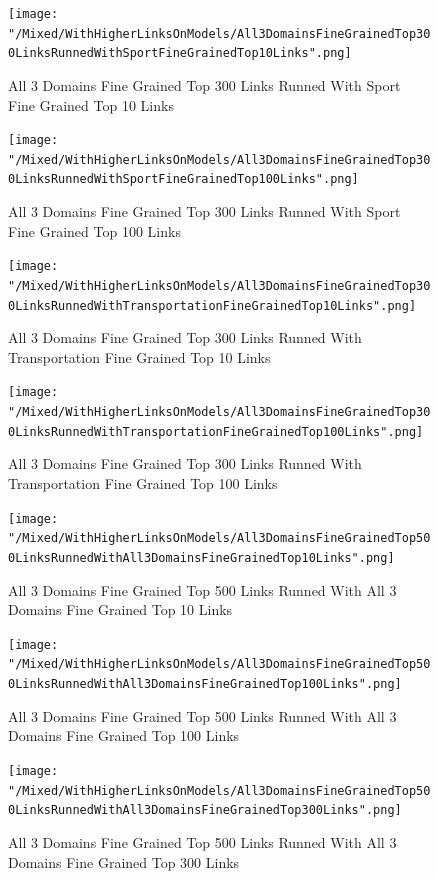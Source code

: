 \documentclass[thesis=M,english]{FITthesis}[2018/05/30]
\begin{document}
	\begin{figure}[H]\centering
		\texttt{[image: "/Mixed/WithHigherLinksOnModels/All3DomainsFineGrainedTop300LinksRunnedWithSportFineGrainedTop10Links".png]}
		\caption{All 3 Domains Fine Grained Top 300 Links Runned With Sport Fine Grained Top 10 Links}\label{}
	\end{figure}
				
	\begin{figure}[H]\centering
		\texttt{[image: "/Mixed/WithHigherLinksOnModels/All3DomainsFineGrainedTop300LinksRunnedWithSportFineGrainedTop100Links".png]}
		\caption{All 3 Domains Fine Grained Top 300 Links Runned With Sport Fine Grained Top 100 Links}\label{}
	\end{figure}
	
	\begin{figure}[H]\centering
		\texttt{[image: "/Mixed/WithHigherLinksOnModels/All3DomainsFineGrainedTop300LinksRunnedWithTransportationFineGrainedTop10Links".png]}
		\caption{All 3 Domains Fine Grained Top 300 Links Runned With Transportation Fine Grained Top 10 Links}\label{}
	\end{figure}
	
	\begin{figure}[H]\centering
		\texttt{[image: "/Mixed/WithHigherLinksOnModels/All3DomainsFineGrainedTop300LinksRunnedWithTransportationFineGrainedTop100Links".png]}
		\caption{All 3 Domains Fine Grained Top 300 Links Runned With Transportation Fine Grained Top 100 Links}\label{}
	\end{figure}
	
	\begin{figure}[H]\centering
		\texttt{[image: "/Mixed/WithHigherLinksOnModels/All3DomainsFineGrainedTop500LinksRunnedWithAll3DomainsFineGrainedTop10Links".png]}
		\caption{All 3 Domains Fine Grained Top 500 Links Runned With All 3 Domains Fine Grained Top 10 Links}\label{}
	\end{figure}	
	
	\begin{figure}[H]\centering
		\texttt{[image: "/Mixed/WithHigherLinksOnModels/All3DomainsFineGrainedTop500LinksRunnedWithAll3DomainsFineGrainedTop100Links".png]}
		\caption{All 3 Domains Fine Grained Top 500 Links Runned With All 3 Domains Fine Grained Top 100 Links}\label{}
	\end{figure}	
	
	\begin{figure}[H]\centering
		\texttt{[image: "/Mixed/WithHigherLinksOnModels/All3DomainsFineGrainedTop500LinksRunnedWithAll3DomainsFineGrainedTop300Links".png]}
		\caption{All 3 Domains Fine Grained Top 500 Links Runned With All 3 Domains Fine Grained Top 300 Links}\label{}
	\end{figure}
	
\end{document}
